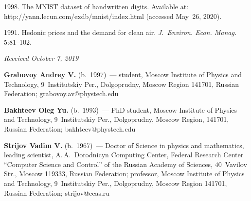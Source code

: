 \begin{multicols}{2}
{{\begin{thebibliography}{99}
 1998. The MNIST dataset of handwritten digits. Available 
at: {\sf http://yann.\linebreak lecun.com/exdb/mnist/index.html} (accessed May~26, 2020).


 1991. Hedonic prices and the demand for clean air. 
\textit{J.~Environ. Econ. Manag.} 
 5:81--102. 
 
\end{thebibliography}

 }
 }

\end{multicols}

\vspace*{-9pt}

\hfill{\small\textit{Received October 7, 2019}}


\vspace*{-18pt}


\Contr

\vspace*{-6pt}

\noindent
\textbf{Grabovoy Andrey V.} (b.\ 1997)~--- student, Moscow Institute of Physics and Technology, 
9~Institutskiy Per., Dolgoprudny, Moscow Region 141701, Russian Federation; 
\mbox{grabovoy.av@phystech.edu}

\vspace*{3pt}

\noindent
\textbf{Bakhteev Oleg Yu.} (b.\ 1993)~--- PhD student, Moscow Institute of Physics and Technology, 
9~Institutskiy Per., Dolgoprudny, Moscow Region, 141701, Russian Federation; 
\mbox{bakhteev@phystech.edu}
\vspace*{3pt}

\noindent
\textbf{Strijov Vadim V.} (b.\ 1967)~--- Doctor of Science in physics and mathematics, leading 
scientist, A.\,A.~Dorodnicyn Computing Center, Federal Research Center ``Computer Science and 
Control'' of the Russian Academy of Sciences, 40~Vavilov Str., Moscow 119333, Russian Federation; 
professor, Moscow Institute of Physics and Technology, 9~Institutskiy Per., Dolgoprudny, Moscow 
Region 141701, Russian Federation; \mbox{strijov@ccas.ru}

\label{end\stat}

\renewcommand{\bibname}{\protect\rm Литература} 